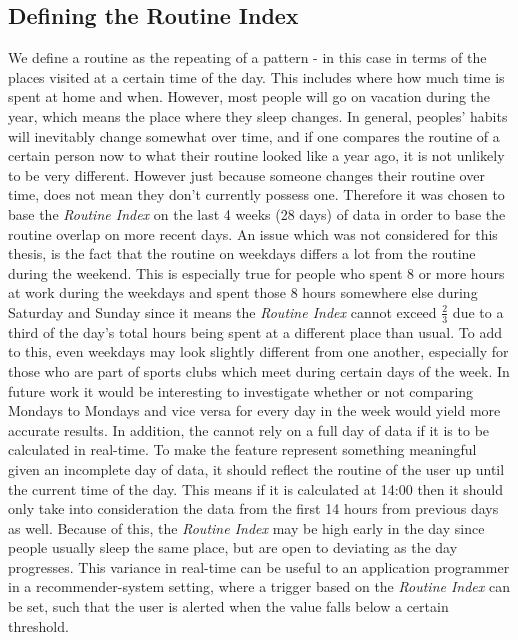 \subsection{Defining the Routine Index}
We define a routine as the repeating of a pattern - in this case in terms of the places visited at a certain time of the day. This includes where how much time is spent at home and when. However, most people will go on vacation during the year, which means the place where they sleep changes. In general, peoples' habits will inevitably change somewhat over time, and if one compares the routine of a certain person now to what their routine looked like a year ago, it is not unlikely to be very different. However just because someone changes their routine over time, does not mean they don't currently possess one. Therefore it was chosen to base the \textit{Routine Index} on the last 4 weeks (28 days) of data in order to base the routine overlap on more recent days. An issue which was not considered for this thesis, is the fact that the routine on weekdays differs a lot from the routine during the weekend. This is especially true for people who spent 8 or more hours at work during the weekdays and spent those 8 hours somewhere else during Saturday and Sunday since it means the \textit{Routine Index} cannot exceed $\frac{2}{3}$ due to a third of the day's total hours being spent at a different place than usual. To add to this, even weekdays may look slightly different from one another, especially for those who are part of sports clubs which meet during certain days of the week. In future work it would be interesting to investigate whether or not comparing Mondays to Mondays and vice versa for every day in the week would yield more accurate results. In addition, the  cannot rely on a full day of data if it is to be calculated in real-time. To make the feature represent something meaningful given an incomplete day of data, it should reflect the routine of the user up until the current time of the day. This means if it is calculated at 14:00 then it should only take into consideration the data from the first 14 hours from previous days as well. Because of this, the \textit{Routine Index} may be high early in the day since people usually sleep the same place, but are open to deviating as the day progresses. This variance in real-time can be useful to an application programmer in a recommender-system setting, where a trigger based on the \textit{Routine Index} can be set, such that the user is alerted when the value falls below a certain threshold.

